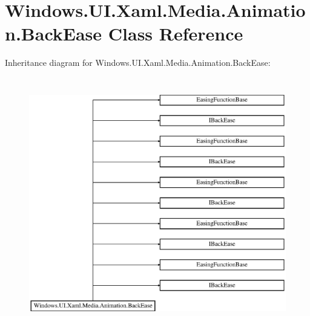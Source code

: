 \hypertarget{class_windows_1_1_u_i_1_1_xaml_1_1_media_1_1_animation_1_1_back_ease}{}\section{Windows.\+U\+I.\+Xaml.\+Media.\+Animation.\+Back\+Ease Class Reference}
\label{class_windows_1_1_u_i_1_1_xaml_1_1_media_1_1_animation_1_1_back_ease}
Inheritance diagram for Windows.\+U\+I.\+Xaml.\+Media.\+Animation.\+Back\+Ease\+:\begin{figure}[H]
\begin{center}
\leavevmode
\includegraphics[height=11.000000cm]{class_windows_1_1_u_i_1_1_xaml_1_1_media_1_1_animation_1_1_back_ease}
\end{center}
\end{figure}

